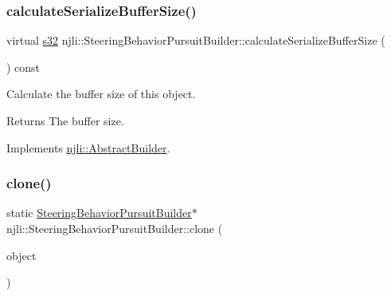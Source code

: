 \mbox{\label{classnjli_1_1_steering_behavior_pursuit_builder_abf877265993bd817fd6275657a66f2e9}} 
\subsubsection{\texorpdfstring{calculate\+Serialize\+Buffer\+Size()}{calculateSerializeBufferSize()}}
{\footnotesize\ttfamily virtual \mbox{\hyperlink{_util_8h_aa62c75d314a0d1f37f79c4b73b2292e2}{s32}} njli\+::\+Steering\+Behavior\+Pursuit\+Builder\+::calculate\+Serialize\+Buffer\+Size (\begin{DoxyParamCaption}{ }\end{DoxyParamCaption}) const\hspace{0.3cm}{\ttfamily [virtual]}}

Calculate the buffer size of this object.

\begin{DoxyReturn}{Returns}
The buffer size. 
\end{DoxyReturn}


Implements \mbox{\hyperlink{classnjli_1_1_abstract_builder_aa1d220053e182c37b31b427499c6eacf}{njli\+::\+Abstract\+Builder}}.

\mbox{\label{classnjli_1_1_steering_behavior_pursuit_builder_ad502722e4a43b00f7272aa6f162c7628}} 
\subsubsection{\texorpdfstring{clone()}{clone()}}
{\footnotesize\ttfamily static \mbox{\hyperlink{classnjli_1_1_steering_behavior_pursuit_builder}{Steering\+Behavior\+Pursuit\+Builder}}$\ast$ njli\+::\+Steering\+Behavior\+Pursuit\+Builder\+::clone (\begin{DoxyParamCaption}\item[{const \mbox{\hyperlink{classnjli_1_1_steering_behavior_pursuit_builder}{Steering\+Behavior\+Pursuit\+Builder}} \&}]{object }\end{DoxyParamCaption})\hspace{0.3cm}{\ttfamily [static]}}

